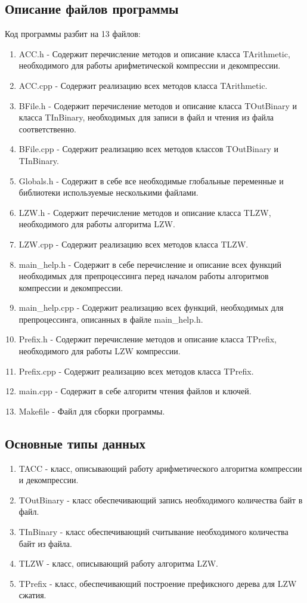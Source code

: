 \documentclass[12pt]{article}
\begin{document}
\subsection*{Описание файлов программы}

Код программы разбит на 13 файлов:

\begin{enumerate}
	\item ACC.h - Содержит перечисление методов и описание класса TArithmetic, необходимого для работы арифметической компрессии и декомпрессии. 
	\item ACC.cpp - Содержит реализацию всех методов класса TArithmetic.
	\item BFile.h - Содержит перечисление методов и описание класса TOutBinary и класса TInBinary, необходимых для записи в файл и чтения из файла соответственно.
	\item BFile.cpp - Содержит реализацию всех методов классов TOutBinary и TInBinary.
	\item Globals.h - Содержит в себе все необходимые глобальные переменные и библиотеки используемые несколькими файлами.
	\item LZW.h - Содержит перечисление методов и описание класса TLZW, необходимого для работы алгоритма LZW.
	\item LZW.cpp - Содержит реализацию всех методов класса TLZW.
	\item main\_help.h - Содержит в себе перечисление и описание всех функций необходимых для препроцессинга перед началом работы алгоритмов компрессии и декомпрессии.
	\item main\_help.cpp - Содержит реализацию всех функций, необходимых для препроцессинга, описанных в файле main\_help.h.
	\item Prefix.h - Содержит перечисление методов и описание класса TPrefix, необходимого для работы LZW компрессии.
	\item Prefix.cpp - Содержит реализацию всех методов класса TPrefix.
	\item main.cpp - Содержит в себе алгоритм чтения файлов и ключей.
	\item Makefile - Файл для сборки программы.
\end{enumerate}

\subsection*{Основные типы данных}

\begin{enumerate}
	\item TACC - класс, описывающий работу арифметического алгоритма компрессии и декомпрессии.
	\item TOutBinary - класс обеспечивающий запись необходимого количества байт в файл.
	\item TInBinary - класс обеспечивающий считывание необходимого количества байт из файла.
	\item TLZW - класс, описывающий работу алгоритма LZW.
	\item TPrefix - класс, обеспечивающий построение префиксного дерева для LZW сжатия.
\end{enumerate}
\end{document}
